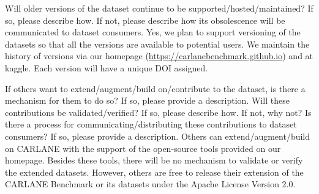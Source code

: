 \documentclass{article}
\begin{document}
	\begin{datasheetitem}{Will older versions of the dataset continue to be supported/hosted/maintained? \normalfont If so, please describe how. If not, please describe how its obsolescence will be communicated to dataset consumers.}
		Yes, we plan to support versioning of the datasets so that all the versions are available to potential users. We maintain the history of versions via our homepage (\url{https://carlanebenchmark.github.io}) and at kaggle. Each version will have a unique DOI assigned.
	\end{datasheetitem}
	\begin{datasheetitem}{If others want to extend/augment/build on/contribute to the dataset, is there a mechanism for them to do so? \normalfont If so, please provide a description. Will these contributions be validated/verified? If so, please describe how. If not, why not? Is there a process for communicating/distributing these contributions to dataset consumers? If so, please provide a description.}
		Others can extend/augment/build on CARLANE with the support of the open-source tools provided on our homepage. Besides these tools, there will be no mechanism to validate or verify the extended datasets. However, others are free to release their extension of the CARLANE Benchmark or its datasets under the Apache License Version 2.0.
	\end{datasheetitem}
\end{document}
